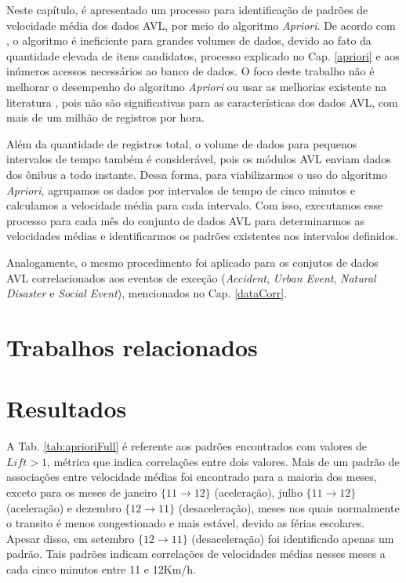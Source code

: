 \documentclass[
	12pt,				%
	oneside,			%
	a4paper,			%
	english,			%
	brazil				%
	]{abntex2ppgsi}
\begin{document}
{{Neste capítulo, é apresentado um processo para identificação de padrões de velocidade média dos dados AVL, por meio do algoritmo \textit{Apriori}. De acordo com \cite{xie2008optimization}, o algoritmo é ineficiente para grandes volumes de dados, devido ao fato da quantidade elevada de itens candidatos, processo explicado no Cap. \ref{apriori} e aos inúmeros acessos necessários ao banco de dados. O foco deste trabalho não é melhorar o desempenho do algoritmo \textit{Apriori} ou usar as melhorias existente na literatura \cite{xie2008optimization, zhang2014method}, pois não são significativas para as características dos dados AVL, com mais de um milhão de registros por hora.

Além da quantidade de registros total, o volume de dados para pequenos intervalos de tempo também é considerável, pois os módulos AVL enviam dados dos ônibus a todo instante. Dessa forma, para viabilizarmos o uso do algoritmo \textit{Apriori}, agrupamos os dados por intervalos de tempo de cinco minutos e calculamos a velocidade média para cada intervalo. Com isso, executamos esse processo para cada mês do conjunto de dados AVL para determinarmos as velocidades médias e identificarmos os padrões existentes nos intervalos definidos.

Analogamente, o mesmo procedimento foi aplicado para os conjutos de dados AVL correlacionados aos eventos de exceção (\textit{Accident}, \textit{Urban Event}, \textit{Natural Disaster} e \textit{Social Event}), mencionados no Cap. \ref{dataCorr}.

\section{Trabalhos relacionados}

\section{Resultados}

A Tab. \ref{tab:aprioriFull} é referente aos padrões encontrados com valores de $\textit{Lift} > 1$, métrica que indica correlações entre dois valores. Mais de um padrão de associações entre velocidade médias foi encontrado para a maioria dos meses, exceto para os meses de janeiro $\lbrace 11 \rightarrow 12 \rbrace$ (aceleração), julho $\lbrace 11 \rightarrow 12\rbrace$ (aceleração) e dezembro $\lbrace12 \rightarrow 11\rbrace$ (desaceleração), meses nos quais normalmente o transito é menos congestionado e mais estável, devido as férias escolares. Apesar disso, em setembro $\lbrace12 \rightarrow 11\rbrace$ (desaceleração) foi identificado apenas um padrão. Tais padrões indicam correlações de velocidades médias nesses meses a cada cinco minutos entre 11 e 12Km/h.

}}
\end{document}
